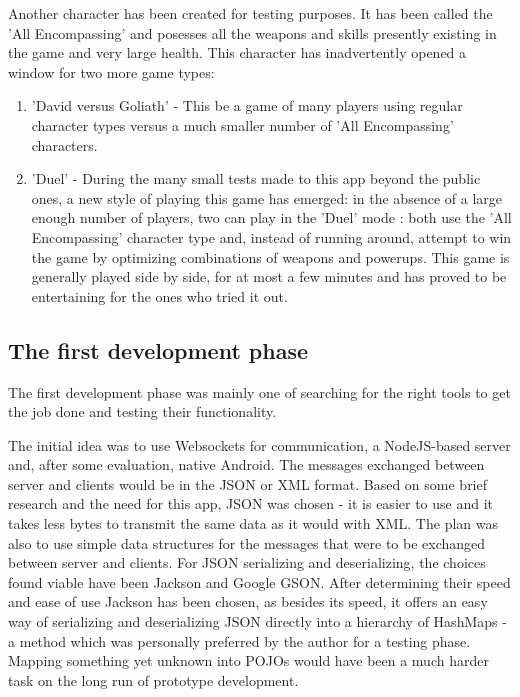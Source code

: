 Another character has been created for testing purposes. It has been called the
'All Encompassing' and posesses all the weapons and skills presently existing in
the game and very large health. This character has inadvertently opened a window
for two more game types: 
\begin{enumerate}
  \item 'David versus Goliath' - This be a game of many players using regular
  character types versus a much smaller number of 'All Encompassing' characters.
  \item 'Duel' - During the many small tests made to this app beyond the public
  ones, a new style of playing this game has emerged: in the absence of a large
  enough number of players, two can play in the 'Duel' mode : both use the 'All
  Encompassing' character type and, instead of running around, attempt to win
  the game by optimizing combinations of weapons and powerups. This game is
  generally played side by side, for at most a few minutes and has proved to be
  entertaining for the ones who tried it out.
\end{enumerate}



\subsection{The first development phase}

The first development phase was mainly one of searching for the right tools to
get the job done and testing their functionality.\newline

The initial idea was to use Websockets for communication, a NodeJS-based server
and, after some evaluation, native Android. The messages exchanged between
server and clients would be in the JSON or XML format. Based on some brief
research and the need for this app, JSON was chosen - it is easier to use and it
takes less bytes to transmit the same data as it would with XML. The plan was
also to use simple data structures for the messages that were to be exchanged
between server and clients. For JSON serializing and deserializing, the choices
found viable have been Jackson and Google GSON. After determining their speed
and ease of use Jackson has been chosen, as besides its speed, it offers an easy
way of serializing and deserializing JSON directly into a hierarchy of HashMaps
- a method which was personally preferred by the author for a testing phase.
Mapping something yet unknown into POJOs would have been a much harder task on
the long run of prototype development. \newline

